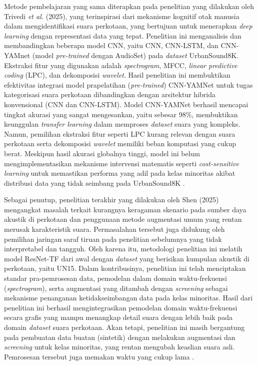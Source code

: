 Metode pembelajaran yang sama diterapkan pada penelitian yang dilakukan oleh Trivedi \textit{et al.} (2025), yang terinspirasi dari mekanisme kognitif otak manusia dalam mengidentifikasi suara perkotaan, yang bertujuan untuk menerapkan \textit{deep learning} dengan representasi data yang tepat.
Penelitian ini menganalisis dan membandingkan beberapa model CNN, yaitu CNN, CNN-LSTM, dan CNN-YAMnet (model \textit{pre-trained} dengan AudioSet) pada \textit{dataset} UrbanSound8K. 
Ekstraksi fitur yang digunakan adalah \textit{spectrogram}, MFCC, \textit{linear predictive coding} (LPC), dan dekomposisi \textit{wavelet}. 
Hasil penelitian ini membuktikan efektivitas integrasi model prapelatihan (\textit{pre-trained}) CNN-YAMNet untuk tugas kategorisasi suara perkotaan dibandingkan dengan arsitektur hibrida konvensional (CNN dan CNN-LSTM).
Model CNN-YAMNet berhasil mencapai tingkat akurasi yang sangat mengesankan, yaitu sebesar 98\%, membuktikan keunggulan \textit{transfer learning} dalam memproses \textit{dataset} suara yang kompleks.
Namun, pemilihan ekstraksi fitur seperti LPC kurang relevan dengan suara perkotaan serta dekomposisi \textit{wavelet} memiliki beban komputasi yang cukup berat.
Meskipun hasil akurasi globalnya tinggi, model ini belum mengimplementasikan mekanisme intervensi matematis seperti \textit{cost-sensitive learning} untuk memastikan performa yang adil pada kelas minoritas akibat distribusi data yang tidak seimbang pada UrbanSound8K \cite{trivedi2025deep}. \par

Sebagai penutup, penelitian terakhir yang dilakukan oleh Shen (2025) mengangkat masalah terkait kurangnya keragaman skenario pada sumber daya akustik di perkotaan dan penggunaan metode augmentasi umum yang rentan merusak karakteristik suara. 
Permasalahan tersebut juga didukung oleh pemilihan jaringan saraf tiruan pada penelitian sebelumnya yang tidak interpretabel dan tangguh.
Oleh karena itu, metodologi penelitian ini melatih model ResNet-TF dari awal dengan \textit{dataset} yang berisikan kumpulan akustik di perkotaan, yaitu UN15. 
Dalam kontribusinya, penelitian ini telah menciptakan standar pra-pemrosesan data, pemodelan dalam domain waktu-frekuensi (\textit{spectrogram}), serta augmentasi yang ditambah dengan \textit{screening} sebagai mekanisme penanganan ketidakseimbangan data pada kelas minoritas.
Hasil dari penelitian ini berhasil mengintegrasikan pemodelan domain waktu-frekuensi secara grafis yang mampu menangkap detail suara dengan lebih baik pada domain \textit{dataset} suara perkotaan. 
Akan tetapi, penelitian ini masih bergantung pada pembuatan data buatan (sintetik) dengan melakukan augmentasi dan \textit{screening} untuk kelas minoritas, yang rentan mengubah keaslian suara asli. 
Pemrosesan tersebut juga memakan waktu yang cukup lama \cite{shen2025study}. \par

